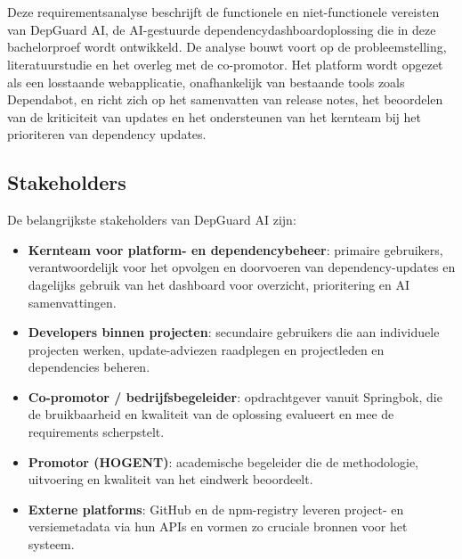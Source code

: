 
\chapter{}%
\label{ch:requirementsanalyse}

Deze requirementsanalyse beschrijft de functionele en niet-functionele vereisten van DepGuard AI, de AI-gestuurde dependencydashboardoplossing die in deze bachelorproef wordt ontwikkeld. De analyse bouwt voort op de probleemstelling, literatuurstudie en het overleg met de co-promotor. Het platform wordt opgezet als een losstaande webapplicatie, onafhankelijk van bestaande tools zoals Dependabot, en richt zich op het samenvatten van release notes, het beoordelen van de kriticiteit van updates en het ondersteunen van het kernteam bij het prioriteren van dependency updates.

\section{Stakeholders}
\label{sec:stakeholders}

De belangrijkste stakeholders van DepGuard AI zijn:

\begin{itemize}
  \item \textbf{Kernteam voor platform- en dependencybeheer}: primaire gebruikers, verantwoordelijk voor het opvolgen en doorvoeren van dependency-updates en dagelijks gebruik van het dashboard voor overzicht, prioritering en AI samenvattingen.
  \item \textbf{Developers binnen projecten}: secundaire gebruikers die aan individuele projecten werken, update-adviezen raadplegen en projectleden en dependencies beheren.
  \item \textbf{Co-promotor / bedrijfsbegeleider}: opdrachtgever vanuit Springbok, die de bruikbaarheid en kwaliteit van de oplossing evalueert en mee de requirements scherpstelt.
  \item \textbf{Promotor (HOGENT)}: academische begeleider die de methodologie, uitvoering en kwaliteit van het eindwerk beoordeelt.
  \item \textbf{Externe platforms}: GitHub en de npm-registry leveren project- en versiemetadata via hun APIs en vormen zo cruciale bronnen voor het systeem.
\end{itemize}

